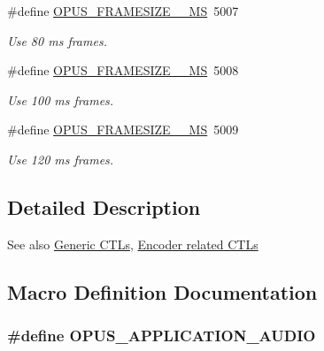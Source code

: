 \begin{DoxyCompactItemize}
\#define \hyperlink{group__opus__ctlvalues_ga2d9c1118aaaa1adfc5e08ffde36b24eb}{O\+P\+U\+S\+\_\+\+F\+R\+A\+M\+E\+S\+I\+Z\+E\+\_\+\_\+\+MS}~5007
\begin{DoxyCompactList}\small\item\em Use 80 ms frames. \end{DoxyCompactList}\item 
\#define \hyperlink{group__opus__ctlvalues_ga0ac306775a5e3000917110928385f9b0}{O\+P\+U\+S\+\_\+\+F\+R\+A\+M\+E\+S\+I\+Z\+E\+\_\+\_\+\+MS}~5008
\begin{DoxyCompactList}\small\item\em Use 100 ms frames. \end{DoxyCompactList}\item 
\#define \hyperlink{group__opus__ctlvalues_gaeae3c8841942991e3c0ff763113e99ce}{O\+P\+U\+S\+\_\+\+F\+R\+A\+M\+E\+S\+I\+Z\+E\+\_\+\_\+\+MS}~5009
\begin{DoxyCompactList}\small\item\em Use 120 ms frames. \end{DoxyCompactList}\end{DoxyCompactItemize}


\subsection{Detailed Description}
\begin{DoxySeeAlso}{See also}
\hyperlink{group__opus__genericctls}{Generic C\+T\+Ls}, \hyperlink{group__opus__encoderctls}{Encoder related C\+T\+Ls} 
\end{DoxySeeAlso}


\subsection{Macro Definition Documentation}
\subsubsection[{\texorpdfstring{O\+P\+U\+S\+\_\+\+A\+P\+P\+L\+I\+C\+A\+T\+I\+O\+N\+\_\+\+A\+U\+D\+IO}{OPUS_APPLICATION_AUDIO}}]{\setlength{\rightskip}{0pt plus 5cm}\#define O\+P\+U\+S\+\_\+\+A\+P\+P\+L\+I\+C\+A\+T\+I\+O\+N\+\_\+\+A\+U\+D\+IO}\hypertarget{group__opus__ctlvalues_ga5909f7cb35c04f1110026c6889edd345}{}\label{group__opus__ctlvalues_ga5909f7cb35c04f1110026c6889edd345}


